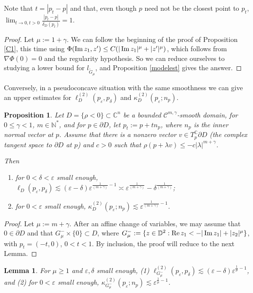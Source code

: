 \documentclass[a4paper,12pt]{amsart}
\def\D{\mathbb D}
\def\C{\mathbb C}
\def\N{\mathbb N}
\newtheorem{prop}[thm]{Proposition}
\newtheorem{lem}[thm]{Lemma}
\renewcommand{\Im}{\operatorname{\rm{Im}}}
\renewcommand{\Re}{\operatorname{\rm{Re}}}
\newcommand{\eps}{\varepsilon}
\begin{document}
Note that $t=|p_t-p|$ and that, even though $p$ need not be the closest point to $p_t$, $\lim_{t\to0, t>0} \frac{|p_t-p|}{\delta_D(p_t)} =1$.

\begin{proof}
Let $\mu:=1+\gamma$.
We can follow the beginning of the proof of Proposition \ref{C1}, this time using $\Phi (\Im z_1, z') \le C(|\Im z_1|^\mu+|z'|^\mu)$,
which follows from $\nabla \Phi (0)=0$ and the regularity hypothesis. So we can reduce ourselves to studying a lower bound for 
$l_{\tilde G_\mu}$, and Proposition \ref{modelest} gives the answer.
\end{proof}

Conversely, in a pseudoconcave situation with the same smoothness we can give an upper estimates for $\ell^{(2)}_D(p_\eps,p_\delta)$
and $ \kappa^{(2)}_D (p_\eps;n_p)$. 

\begin{prop}
\label{onegammatwo}
Let $D= \{\rho<0\} \subset \C^n$  be a bounded $\mathcal C^{m,\gamma}$-smooth  domain, for $0\le \gamma <1$, $m\in \N^*$, and
for $p\in \partial D$, let $p_t := p+t n_p$, where $n_p$ is the inner normal vector at $p$. 
Assume that there is a nonzero vector $v \in T_p^{\C}\partial D$ (the complex tangent space to $\partial D$ at $p$) and $c>0$
such that $\rho (p + \lambda v) \le - c |\lambda|^{m+\gamma}$.

Then 
\begin{enumerate}
\item
for $0< \delta < \eps$ small enough, $\ell_D(p_\eps,p_\delta) \lesssim (\eps-\delta)\eps^{\frac1{(m+\gamma)}-1}
\asymp \eps^{\frac1{(m+\gamma)}} - \delta^{\frac1{(m+\gamma)}}$;
\item
for $0< \eps$ small enough, $ \kappa^{(2)}_D (p_\eps;n_p) \lesssim \eps^{\frac1{(m+\gamma)}-1}$.
\end{enumerate}
\end{prop}

\begin{proof}
Let $\mu:=m+\gamma$. After an affine change of variables, we may assume that $0\in \partial D$ and that $G^-_\mu \times \{0\} \subset D$,
where $G^-_\mu := \{z\in \D^2: \Re z_1 < -| \Im z_1| +  |z_2|^\mu \}$, with $p_t=(-t,0)$, $0<t<1$.
By inclusion, the proof will reduce to the next Lemma.
\end{proof}

\begin{lem}
\label{modelminus}
For $\mu\ge 1$ and $\eps, \delta$ small enough, (1) $\ell_{G^-_\mu}^{(2)}(p_\eps,p_\delta) \lesssim (\eps-\delta)\eps^{\frac1{\mu}-1}$,
and (2) for $0< \eps$ small enough, $ \kappa^{(2)}_{G^-_\mu} (p_\eps;n_p) \lesssim \eps^{\frac1{\mu}-1}$.
\end{lem}
\end{document}
